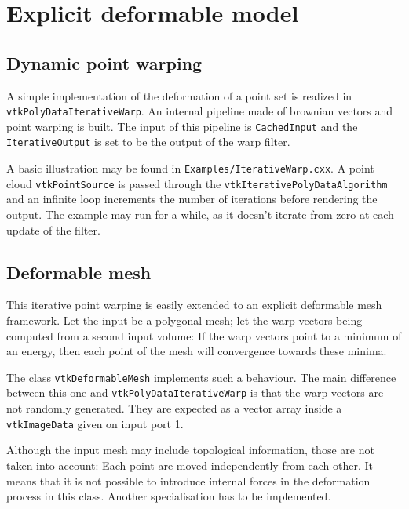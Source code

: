 \documentclass{InsightArticle}
\begin{document}
\section{Explicit deformable model}
%
\subsection{Dynamic point warping}
%
A simple implementation of the deformation of a point set is realized in
\verb!vtkPolyDataIterativeWarp!. An internal pipeline made of brownian vectors
and point warping is built. The input of this pipeline is \verb!CachedInput!
and the \verb!IterativeOutput! is set to be the output of the warp filter.

A basic illustration may be found in \verb!Examples/IterativeWarp.cxx!. A point
cloud \verb!vtkPointSource! is passed through the 
\verb!vtkIterativePolyDataAlgorithm! and an infinite loop increments the 
number of iterations before rendering the output. The example may run for a 
while, as it doesn't iterate from zero at each update of the filter.
%
\subsection{Deformable mesh}
%
This iterative point warping is easily extended to an explicit deformable mesh
framework. Let the input be a polygonal mesh; let the warp vectors being 
computed from a second input volume: If the warp vectors point to a minimum of 
an energy, then each point of the mesh will convergence towards these minima.

The class \verb!vtkDeformableMesh! implements such a behaviour. The main 
difference between this one and \verb!vtkPolyDataIterativeWarp! is that the warp
vectors are not randomly generated. They are expected as a vector array inside 
a \verb!vtkImageData! given on input port 1.

Although the input mesh may include topological information, those are not taken
into account: Each point are moved independently from each other. It means that
it is not possible to introduce internal forces in the deformation process in 
this class. Another specialisation has to be implemented.
\end{document}
